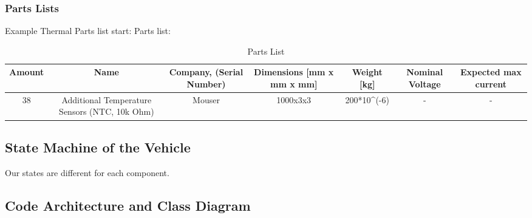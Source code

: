 \subsubsection{Parts Lists}
Example Thermal Parts list start:
Parts list:
\begin{table}[h]
    \centering
    \caption{Parts List}
        \begin{adjustbox}{width=\textwidth,center}
    \begin{tabular}{|c|c|c|c|c|c|c|}
        \hline
        \textbf{Amount} & \textbf{Name} & \textbf{Company, (Serial Number)} & \textbf{Dimensions [mm x mm x mm]} & \textbf{Weight [kg]} & \textbf{Nominal Voltage} & \textbf{Expected max current} \\
        \hline
        38& Additional Temperature Sensors (NTC, 10k Ohm) & Mouser & 1000x3x3& 200*10^(-6)& - & - \\
    \end{tabular}
        \end{adjustbox}
\end{table}


\subsection{State Machine of the Vehicle}

Our states are different for each component.

\subsection{Code Architecture and Class Diagram}

